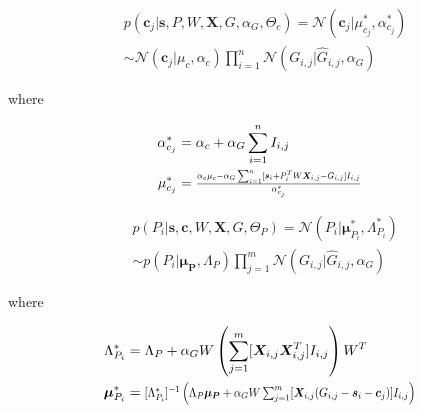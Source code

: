 \documentclass[10pt]{proc}
\begin{document}
\begin{mdframed}[style=eqbox]
\begin{equation} \label{cpd-c}
\begin{aligned}
    &p(\bm{c}_j | \bm{s}, P, W, \bm{X}, G, \alpha_G, \Theta_c)
        = \mathcal{N}(\bm{c}_j | \mu_{c_j}^*, \alpha_{c_j}^*) \\
        & \sim \mathcal{N}(\bm{c}_j | \mu_c, \alpha_c)
               \prod_{i=1}^n \mathcal{N}(G_{i,j} | \hat{G}_{i,j}, \alpha_G)
\end{aligned}
\end{equation}

where

\begin{align}
    \alpha_{c_j}^* &= \begin{aligned}[t]
        \alpha_c + \alpha_G \sum_{i=1}^n I_{i,j}
    \end{aligned}\\
%
    \mu_{c_j}^* &= \begin{aligned}[t]
        \hstretch{0.8}{\vstretch{0.9}{
            \frac{\alpha_c\mu_c -
                  \alpha_G \sum_{i=1}^n
                      [\bm{s}_i + P_i^TW\bm{X}_{i,j} - G_{i,j} ] I_{i,j}}
                 {\alpha_{c_j}^*}}}
    \end{aligned}
\end{align}
\end{mdframed}


\begin{mdframed}[style=eqbox]
{\setlength{\mathindent}{0cm}
\begin{equation} \label{cpd-P}
\begin{aligned}
    &p(P_i | \bm{s}, \bm{c}, W, \bm{X}, G, \Theta_P) =
        \mathcal{N}(P_i | \bm{\mu}_{P_i}^*, \Lambda_{P_i}^*) \\
        & \sim p(P_i | \bm{\mu_P}, \Lambda_P)
            \prod_{j=1}^m \mathcal{N}(G_{i,j} | \hat{G}_{i,j}, \alpha_G)
\end{aligned}
\end{equation}

where

\begin{align}
    \Lambda_{P_i}^* &= \begin{aligned}[t]
        \Lambda_P +
        \alpha_G W \left(
            \sum_{j=1}^m [\bm{X}_{i,j} \bm{X}_{i,j}^T ] I_{i,j}
        \right) W^T
    \end{aligned}\\
%
    \bm{\mu}_{P_i}^* &= \begin{aligned}[t]
        \vstretch{0.9}{\hstretch{0.8}{
            [\Lambda_{P_i}^*]^{-1} \left(
                \Lambda_P\bm{\mu_P} +
                \alpha_G W \sum_{j=1}^m
                    [\bm{X}_{i,j}(G_{i,j} - \bm{s}_i - \bm{c}_j)] I_{i,j}
            \right)}}
        \end{aligned}
\end{align}}
\end{mdframed}
\end{document}
